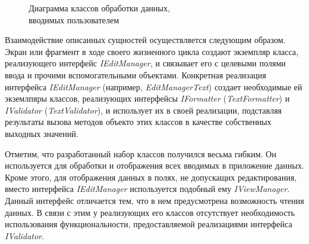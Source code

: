 \begin{figure}[h!]
  \centering
  \caption{Диаграмма классов обработки данных, \\ вводимых пользователем}
  \label{fig:implementation_ui_edit_manager}
\end{figure}

Взаимодействие описанных сущностей осуществляется следующим образом.
Экран или фрагмент в ходе своего жизненного цикла создают экземпляр класса,
реализующего интерфейс \textit{IEditManager}, и связывает его с целевыми
полями ввода и прочими вспомогательными объектами.
Конкретная реализация интерфейса \textit{IEditManager}
(например, \textit{EditManagerText})
создает необходимые ей экземлпяры классов, реализующих интерфейсы
\textit{IFormatter} (\textit{TextFormatter})
и \textit{IValidator} (\textit{TextValidator}),
и использует их в своей реализации,
подставляя результаты вызова методов объекто этих классов
в качестве собственных выходных значений.

Отметим, что разработанный набор классов получился весьма гибким.
Он используется для обработки и отображения всех вводимых в приложение данных.
Кроме этого, для отображения данных в полях, не допускащих редактирования,
вместо интерфейса \textit{IEditManager} используется подобный ему \textit{IViewManager}.
Данный интерфейс отличается тем, что в нем предусмотрена возможность чтения данных.
В связи с этим у реализующих его классов отсутствует необходимость
использования функциональности, предоставляемой реализациями интерфейса \textit{IValidator}.

